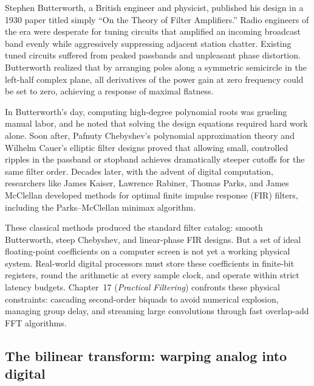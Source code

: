 \begin{historybox}
Stephen Butterworth, a British engineer and physicist, published his design in a
1930 paper titled simply ``On the Theory of Filter Amplifiers.'' Radio engineers of the era were
desperate for tuning circuits that amplified an incoming broadcast band evenly while aggressively
suppressing adjacent station chatter. Existing tuned circuits suffered from peaked passbands and
unpleasant phase distortion. Butterworth realized that by arranging poles along a symmetric semicircle
in the left-half complex plane, all derivatives of the power gain at zero frequency could be set to zero,
achieving a response of maximal flatness.

In Butterworth's day, computing high-degree polynomial roots was grueling manual labor, and he noted that
solving the design equations required hard work alone. Soon after, Pafnuty Chebyshev's
polynomial approximation theory and Wilhelm Cauer's elliptic filter designs proved that allowing small,
controlled ripples in the passband or stopband achieves dramatically steeper cutoffs for the same
filter order. Decades later, with the advent of digital computation, researchers like James Kaiser, Lawrence Rabiner, Thomas Parks, and James McClellan developed methods for optimal finite impulse response (FIR) filters, including the Parks--McClellan minimax algorithm.

These classical methods produced the standard filter catalog: smooth Butterworth, steep Chebyshev,
and linear-phase FIR designs. But a set of ideal floating-point coefficients on a computer screen is not
yet a working physical system. Real-world digital processors must store these coefficients in finite-bit
registers, round the arithmetic at every sample clock, and operate within strict latency budgets.
Chapter~17 (\emph{Practical Filtering}) confronts these physical constraints: cascading second-order
biquads to avoid numerical explosion, managing group delay, and streaming large convolutions through
fast overlap-add FFT algorithms.
\end{historybox}

\subsection{The bilinear transform: warping analog into digital}
\label{ch16:bilinear}

